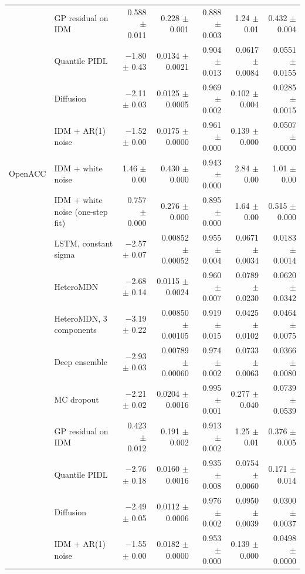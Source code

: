 \begin{longtable}{llrrrrr}
 & GP residual on IDM & 0.588 $\pm$ 0.011 & 0.228 $\pm$ 0.001 & 0.888 $\pm$ 0.003 & 1.24 $\pm$ 0.01 & 0.432 $\pm$ 0.004 \\
 & Quantile PIDL & $-$1.80 $\pm$ 0.43 & 0.0134 $\pm$ 0.0021 & 0.904 $\pm$ 0.013 & 0.0617 $\pm$ 0.0084 & 0.0551 $\pm$ 0.0155 \\
 & Diffusion & $-$2.11 $\pm$ 0.03 & 0.0125 $\pm$ 0.0005 & 0.969 $\pm$ 0.002 & 0.102 $\pm$ 0.004 & 0.0285 $\pm$ 0.0015 \\
 & IDM + AR(1) noise & $-$1.52 $\pm$ 0.00 & 0.0175 $\pm$ 0.0000 & 0.961 $\pm$ 0.000 & 0.139 $\pm$ 0.000 & 0.0507 $\pm$ 0.0000 \\
\midrule
OpenACC & IDM + white noise & 1.46 $\pm$ 0.00 & 0.430 $\pm$ 0.000 & 0.943 $\pm$ 0.000 & 2.84 $\pm$ 0.00 & 1.01 $\pm$ 0.00 \\
 & IDM + white noise (one-step fit) & 0.757 $\pm$ 0.000 & 0.276 $\pm$ 0.000 & 0.895 $\pm$ 0.000 & 1.64 $\pm$ 0.00 & 0.515 $\pm$ 0.000 \\
 & LSTM, constant sigma & $-$2.57 $\pm$ 0.07 & 0.00852 $\pm$ 0.00052 & 0.955 $\pm$ 0.004 & 0.0671 $\pm$ 0.0034 & 0.0183 $\pm$ 0.0014 \\
 & HeteroMDN & $-$2.68 $\pm$ 0.14 & 0.0115 $\pm$ 0.0024 & 0.960 $\pm$ 0.007 & 0.0789 $\pm$ 0.0230 & 0.0620 $\pm$ 0.0342 \\
 & HeteroMDN, 3 components & $-$3.19 $\pm$ 0.22 & 0.00850 $\pm$ 0.00105 & 0.919 $\pm$ 0.015 & 0.0425 $\pm$ 0.0102 & 0.0464 $\pm$ 0.0075 \\
 & Deep ensemble & $-$2.93 $\pm$ 0.03 & 0.00789 $\pm$ 0.00060 & 0.974 $\pm$ 0.002 & 0.0733 $\pm$ 0.0063 & 0.0366 $\pm$ 0.0080 \\
 & MC dropout & $-$2.21 $\pm$ 0.02 & 0.0204 $\pm$ 0.0016 & 0.995 $\pm$ 0.001 & 0.277 $\pm$ 0.040 & 0.0739 $\pm$ 0.0539 \\
 & GP residual on IDM & 0.423 $\pm$ 0.012 & 0.191 $\pm$ 0.002 & 0.913 $\pm$ 0.002 & 1.25 $\pm$ 0.01 & 0.376 $\pm$ 0.005 \\
 & Quantile PIDL & $-$2.76 $\pm$ 0.18 & 0.0160 $\pm$ 0.0016 & 0.935 $\pm$ 0.008 & 0.0754 $\pm$ 0.0060 & 0.171 $\pm$ 0.014 \\
 & Diffusion & $-$2.49 $\pm$ 0.05 & 0.0112 $\pm$ 0.0006 & 0.976 $\pm$ 0.002 & 0.0950 $\pm$ 0.0039 & 0.0300 $\pm$ 0.0037 \\
 & IDM + AR(1) noise & $-$1.55 $\pm$ 0.00 & 0.0182 $\pm$ 0.0000 & 0.953 $\pm$ 0.000 & 0.139 $\pm$ 0.000 & 0.0498 $\pm$ 0.0000 \\
\end{longtable}
\endgroup
